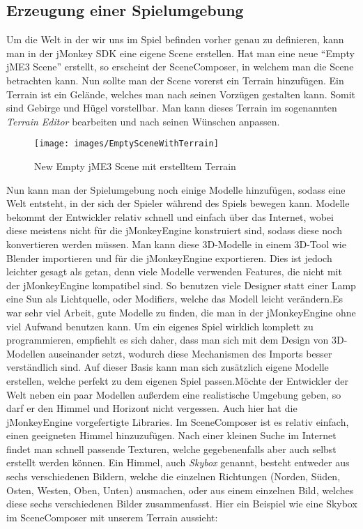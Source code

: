 \subsection{Erzeugung einer Spielumgebung}
Um die Welt in der wir uns im Spiel befinden vorher genau zu definieren, kann man in der jMonkey SDK eine eigene Scene erstellen. Hat man eine neue \enquote{Empty jME3 Scene} erstellt, so erscheint der SceneComposer, in welchem man die Scene betrachten kann.
Nun sollte man der Scene vorerst ein Terrain hinzufügen. Ein Terrain ist ein Gelände, welches man nach seinen Vorzügen gestalten kann. Somit sind Gebirge und Hügel vorstellbar. Man kann dieses Terrain im sogenannten \emph{Terrain Editor} bearbeiten und nach seinen Wünschen anpassen.\begin{figure}[H]
	
	
	\centering\texttt{[image: images/EmptySceneWithTerrain]} 
	\caption{New Empty jME3 Scene mit erstelltem Terrain}
	
\end{figure}\pagebreak
Nun kann man der Spielumgebung noch einige Modelle hinzufügen, sodass eine Welt entsteht, in der sich der Spieler während des Spiels bewegen kann. Modelle bekommt der Entwickler relativ schnell und einfach über das Internet, wobei diese meistens nicht für die jMonkeyEngine konstruiert sind, sodass diese noch konvertieren werden müssen. Man kann diese 3D-Modelle in einem 3D-Tool wie Blender importieren und für die jMonkeyEngine exportieren. Dies ist jedoch leichter gesagt als getan, denn viele Modelle verwenden Features, die nicht mit der jMonkeyEngine kompatibel sind. So benutzen viele Designer statt einer Lamp eine Sun als Lichtquelle, oder Modifiers, welche das Modell leicht verändern.\newline Es war sehr viel Arbeit, gute Modelle zu finden, die man in der jMonkeyEngine ohne viel Aufwand benutzen kann. Um ein eigenes Spiel wirklich komplett zu programmieren, empfiehlt es sich daher, dass man sich mit dem Design von 3D-Modellen auseinander setzt, wodurch diese Mechanismen des Imports besser verständlich sind. Auf dieser Basis kann man sich zusätzlich eigene Modelle erstellen, welche perfekt zu dem eigenen Spiel passen.\newline Möchte der Entwickler der Welt neben ein paar Modellen außerdem eine realistische Umgebung geben, so darf er den Himmel und Horizont nicht vergessen. Auch hier hat die jMonkeyEngine vorgefertigte Libraries. Im SceneComposer ist es relativ einfach, einen geeigneten Himmel hinzuzufügen. Nach einer kleinen Suche im Internet findet man schnell passende Texturen, welche gegebenenfalls aber auch selbst erstellt werden können. Ein Himmel, auch \emph{Skybox} genannt, besteht entweder aus sechs verschiedenen Bildern, welche die einzelnen Richtungen (Norden, Süden, Osten, Westen, Oben, Unten) ausmachen, oder aus einem einzelnen Bild, welches diese sechs verschiedenen Bilder zusammenfasst. Hier ein Beispiel wie eine Skybox im SceneComposer mit unserem Terrain aussieht:

